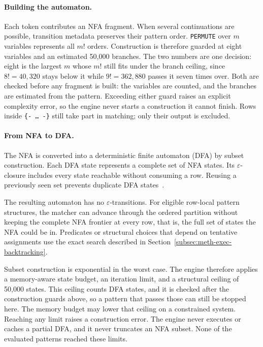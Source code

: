 \paragraph{Building the automaton.}
Each token contributes an NFA fragment.  When several continuations are
possible, transition metadata preserves their pattern order.
\texttt{PERMUTE} over $m$ variables represents all $m!$ orders.
Construction is therefore guarded at eight variables and an estimated
50{,}000 branches.  The two numbers are one decision: eight is the
largest $m$ whose $m!$ still fits under the branch ceiling, since
$8! = 40{,}320$ stays below it while $9! = 362{,}880$ passes it seven
times over.  Both are checked before any fragment is built: the
variables are counted, and the branches are estimated from the pattern.
Exceeding either guard raises an explicit complexity error, so the
engine never starts a construction it cannot finish.  Rows inside \texttt{\{-\ \ldots\ -\}} still take
part in matching; only their output is excluded.

\paragraph{From NFA to DFA.}
The NFA is converted into a deterministic finite automaton (DFA) by
subset construction.  Each DFA state represents a complete set of NFA
states.  Its $\varepsilon$-closure includes every state reachable
without consuming a row.  Reusing a previously seen set prevents
duplicate DFA states~\cite{HopcroftUllman}.

The resulting automaton has no $\varepsilon$-transitions.  For eligible
row-local pattern structures, the matcher can advance through the
ordered partition without keeping the complete NFA frontier at every
row, that is, the full set of states the NFA could be in.  Predicates or structural choices that depend on tentative
assignments use the exact search described in
Section~\ref{subsec:meth-exec-backtracking}.

Subset construction is exponential in the worst case.  The engine
therefore applies a memory-aware state budget, an iteration limit, and
a structural ceiling of 50{,}000 states.  This ceiling counts DFA
states, and it is checked after the construction guards above, so a
pattern that passes those can still be stopped here.  The memory
budget may lower that ceiling on a constrained system.  Reaching any limit raises a
construction error.  The engine never executes or caches a partial DFA,
and it never truncates an NFA subset.  None of the evaluated patterns
reached these limits.

